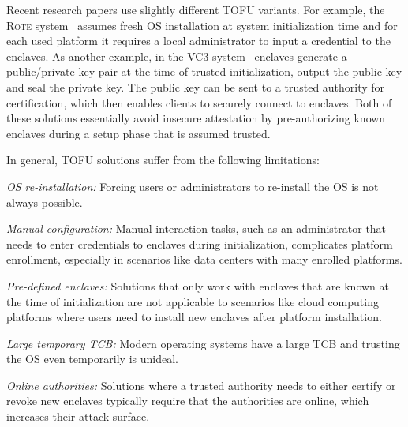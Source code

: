\parasaver
{}
Recent research papers use slightly different TOFU variants. For example, the \textsc{Rote} system~\cite{matetic2017rote} assumes fresh OS installation at system initialization time and for each used platform it requires a local administrator to input a credential to the enclaves. As another example, in the \textsc{VC3} system~\cite{schuster2015vc3} enclaves generate a public/private key pair at the time of trusted initialization, output the public key and seal the private key. The public key can be sent to a trusted authority for certification, which then enables clients to securely connect to enclaves. Both of these solutions essentially avoid insecure attestation by pre-authorizing known enclaves during a setup phase that is assumed trusted. 

In general, TOFU solutions suffer from the following limitations:

\begin{mylist}
  \item \emph{OS re-installation:} Forcing users or administrators to re-install the OS is not always possible. 
  
  \item \emph{Manual configuration:} Manual interaction tasks, such as an administrator that needs to enter credentials to enclaves during initialization, complicates platform enrollment, especially in scenarios like data centers with many enrolled platforms.

  \item \emph{Pre-defined enclaves:} Solutions that only work with enclaves that are known at the time of initialization are not applicable to scenarios like cloud computing platforms where users need to install new enclaves after platform installation. 

  \item \emph{Large temporary TCB:} Modern operating systems have a large TCB and trusting the OS even temporarily is unideal.

  \item \emph{Online authorities:} Solutions where a trusted authority needs to either certify or revoke new enclaves typically require that the authorities are online, which increases their attack surface.
\end{mylist}


